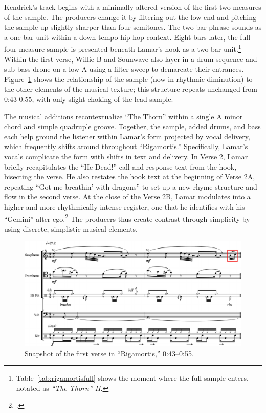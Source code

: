 Kendrick's track begins with a minimally-altered version of the first two measures of the 
sample. The producers change it by filtering out the low end and pitching the sample up 
slightly  sharper than four semitones. The two-bar phrase sounds as a one-bar unit within
a down tempo hip-hop context. Eight bars later, the full four-measure sample is presented
beneath Lamar's hook as a two-bar unit.\footnote{
    Table~\ref{tab:rigamortisfull} shows the moment where the full sample enters, notated
    as \textit{``The Thorn'' II}.}
Within the first verse, Willie B and Sounwave also layer in a drum sequence and sub bass 
drone on a low A using a filter sweep to demarcate their entrances. 
Figure~\ref{fig:rigamortisnoslip} shows the relationship of the sample (now in rhythmic
diminution) to the other elements of the musical texture; this structure repeats unchanged 
from 0:43-0:55, with only slight choking of the lead sample.

The musical additions recontextualize ``The Thorn'' within a single A minor chord and simple 
quadruple groove. Together, the sample, added drums, and bass each help ground the listener within 
Lamar's form projected by vocal delivery, which frequently shifts around throughout ``Rigamortis.''
Specifically, Lamar's vocals complicate the form with shifts in text and delivery. In Verse 2, Lamar
briefly recapitulates the ``He Dead!'' call-and-response text from the hook, bisecting the verse.
He also restates the hook text at the beginning of Verse 2A, repeating ``Got me breathin' with 
dragons'' to set up a new rhyme structure and flow in the second verse. At the close of the Verse
2B, Lamar modulates into a higher and more rhythmically intense register, one that he identifies with 
his ``Gemini'' alter-ego.\footnote{
    \cite{chrismenchTrackingManyVoices2017}.}
The producers thus create contrast through simplicity by using discrete, simplistic musical elements.

\begin{figure}[ht]
    \centering
    \includegraphics[width=\textwidth]{images/figures/chp 02/043053rigamortusnoslip.pdf}
    \caption{Snapshot of the first verse in ``Rigamortis,'' 0:43--0:55.}
    \label{fig:rigamortisnoslip}
\end{figure}

